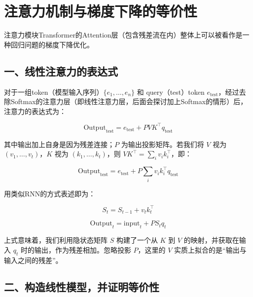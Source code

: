 \setcounter{section}{5}

\hypertarget{ux6ce8ux610fux529bux673aux5236ux4e0eux68afux5ea6ux4e0bux964dux7684ux7b49ux4ef7ux6027}{%
\section{注意力机制与梯度下降的等价性}\label{ux6ce8ux610fux529bux673aux5236ux4e0eux68afux5ea6ux4e0bux964dux7684ux7b49ux4ef7ux6027}}

注意力模块Transformer的Attention层（包含残差流在内）整体上可以被看作是一种回归问题的梯度下降优化。

\hypertarget{ux4e00ux7ebfux6027ux6ce8ux610fux529bux7684ux8868ux8fbeux5f0f}{%
\subsection{一、线性注意力的表达式}\label{ux4e00ux7ebfux6027ux6ce8ux610fux529bux7684ux8868ux8fbeux5f0f}}

对于一组token（模型输入序列）\(\{e_1,\ldots,e_n\}\) 和 query（test）token \(e_{\mathrm{test}}\)，经过去除Softmax的注意力层（即线性注意力层，后面会探讨加上Softmax的情形）后，注意力的表达式为：

\[
\mathrm{Output}_{\mathrm{test}}=e_{\mathrm{test}}+PVK^\top q_{\mathrm{test}}
\tag{1}
\]

其中输出加上自身是因为残差连接；\(P\) 为输出投影矩阵。若我们将 \(V\) 视为 \((v_1,\ldots,v_t)\)，\(K\) 视为 \((k_1,\ldots,k_t)\)，则 \(VK^\top=\sum_i v_i k_i^\top\)，即：

\[
\mathrm{Output}_{\mathrm{test}}=e_{\mathrm{test}}+P\sum_i v_i k_i^\top q_{\mathrm{test}}
\tag{2}
\]

用类似RNN的方式表述即为：

\[
S_t=S_{t-1}+v_t k_t^\top
\]

\[
\mathrm{Output}_t=\mathrm{input}_t+PS_tq_t
\]

上式意味着，我们利用隐状态矩阵 \(S\) 构建了一个从 \(K\) 到 \(V\) 的映射，并获取在输入 \(q_t\) 时的输出，作为残差相加。忽略投影 \(P\)，这里的 \(V\) 实质上拟合的是``输出与输入之间的残差''。

\hypertarget{ux4e8cux6784ux9020ux7ebfux6027ux6a21ux578bux5e76ux8bc1ux660eux7b49ux4ef7ux6027}{%
\subsection{二、构造线性模型，并证明等价性}\label{ux4e8cux6784ux9020ux7ebfux6027ux6a21ux578bux5e76ux8bc1ux660eux7b49ux4ef7ux6027}}

